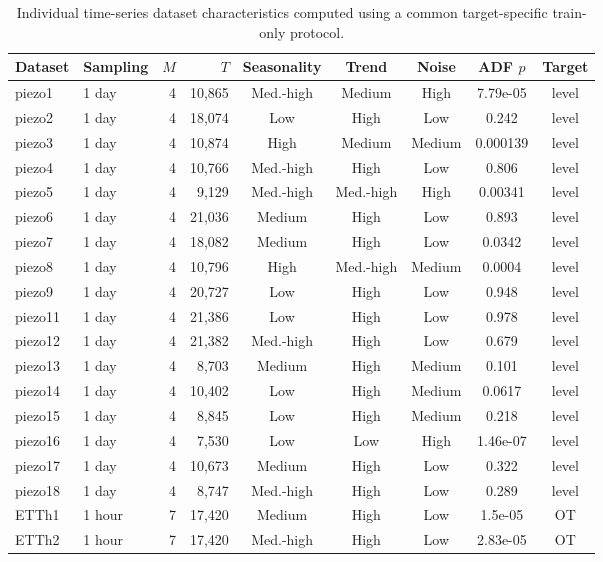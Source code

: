 \begin{table}[t]
\centering
\caption{Individual time-series dataset characteristics computed using a common target-specific train-only protocol.}
\label{tab:dataset_characteristics_full}
\scriptsize
\setlength{\tabcolsep}{3pt}
\begin{tabular}{@{}llrrccccc@{}}
\toprule
Dataset & Sampling & $M$ & $T$ & Seasonality & Trend & Noise & ADF $p$ & Target \\
\midrule
piezo1 & 1 day & 4 & 10,865 & Med.-high & Medium & High & 7.79e-05 & level \\
piezo2 & 1 day & 4 & 18,074 & Low & High & Low & 0.242 & level \\
piezo3 & 1 day & 4 & 10,874 & High & Medium & Medium & 0.000139 & level \\
piezo4 & 1 day & 4 & 10,766 & Med.-high & High & Low & 0.806 & level \\
piezo5 & 1 day & 4 & 9,129 & Med.-high & Med.-high & High & 0.00341 & level \\
piezo6 & 1 day & 4 & 21,036 & Medium & High & Low & 0.893 & level \\
piezo7 & 1 day & 4 & 18,082 & Medium & High & Low & 0.0342 & level \\
piezo8 & 1 day & 4 & 10,796 & High & Med.-high & Medium & 0.0004 & level \\
piezo9 & 1 day & 4 & 20,727 & Low & High & Low & 0.948 & level \\
piezo11 & 1 day & 4 & 21,386 & Low & High & Low & 0.978 & level \\
piezo12 & 1 day & 4 & 21,382 & Med.-high & High & Low & 0.679 & level \\
piezo13 & 1 day & 4 & 8,703 & Medium & High & Medium & 0.101 & level \\
piezo14 & 1 day & 4 & 10,402 & Low & High & Medium & 0.0617 & level \\
piezo15 & 1 day & 4 & 8,845 & Low & High & Medium & 0.218 & level \\
piezo16 & 1 day & 4 & 7,530 & Low & Low & High & 1.46e-07 & level \\
piezo17 & 1 day & 4 & 10,673 & Medium & High & Low & 0.322 & level \\
piezo18 & 1 day & 4 & 8,747 & Med.-high & High & Low & 0.289 & level \\
\midrule
ETTh1 & 1 hour & 7 & 17,420 & Medium & High & Low & 1.5e-05 & OT \\
ETTh2 & 1 hour & 7 & 17,420 & Med.-high & High & Low & 2.83e-05 & OT \\

\end{tabular}
\end{table}
